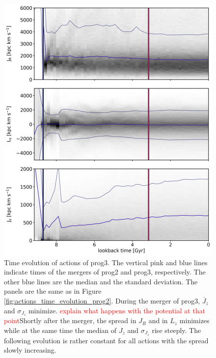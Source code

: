 \begin{figure}
\captionsetup{format=plain}
    \centering
	\includegraphics[width=\textwidth]{plots/Dynamics/prog3/action_time_evolution_wodisk_hist_mean.png}
    \caption{Time evolution of actions of prog3. The vertical pink and blue lines indicate times of the mergers of prog2 and prog3, respectively. The other blue lines are the median and the standard deviation. The panels are the same as in Figure \ref{fig:actions_time_evolution_prog2}. During the merger of prog3, $\overline{J}_z$ and $\sigma{_J_z}$ minimize. \textcolor{red}{explain what happens with the potential at that point}Shortly after the merger, the spread in $J_R$ and in $L_z$ minimizes while at the same time the median of $J_z$ and $\sigma{_J_z}$ rise steeply. The following evolution is rather constant for all actions with the spread slowly increasing.}\label{fig:actions_time_evolution_prog3}
\end{figure}

